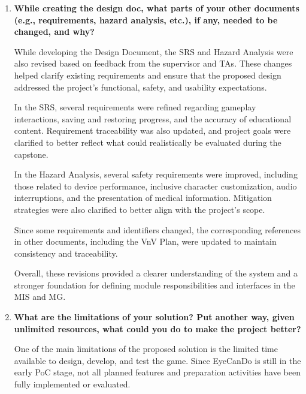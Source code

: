 \documentclass[10pt, titlepage]{article}
\begin{document}
\begin{enumerate}
    Other technical decisions, particularly the module
    decomposition and interfaces documented in the MG and MIS,
    were made based on the existing Unity PoC, the SRS,
    the Hazard Analysis, and software engineering principles.
    These decisions focused on separating responsibilities,
    reducing dependencies, and making the application easier
    to develop, test, and maintain.


    \item \textbf{While creating the design doc, what parts of your other
    documents (e.g., requirements, hazard analysis, etc.), if any, needed to
    be changed, and why?}

    While developing the Design Document, the SRS and Hazard
    Analysis were also revised based on feedback from the
    supervisor and TAs. These changes helped clarify existing
    requirements and ensure that the proposed design addressed
    the project's functional, safety, and usability expectations.

    In the SRS, several requirements were refined regarding
    gameplay interactions, saving and restoring progress, and
    the accuracy of educational content. Requirement traceability
    was also updated, and project goals were clarified to better
    reflect what could realistically be evaluated during the
    capstone.

    In the Hazard Analysis, several safety requirements were
    improved, including those related to device performance,
    inclusive character customization, audio interruptions,
    and the presentation of medical information. Mitigation
    strategies were also clarified to better align with the
    project's scope.

    Since some requirements and identifiers changed, the
    corresponding references in other documents, including
    the VnV Plan, were updated to maintain consistency
    and traceability.

    Overall, these revisions provided a clearer understanding
    of the system and a stronger foundation for defining
    module responsibilities and interfaces in the MIS and MG.

    \item \textbf{What are the limitations of your solution? Put another way,
    given unlimited resources, what could you do to make the project better?}

    
    One of the main limitations of the proposed solution is the
    limited time available to design, develop, and test the game.
    Since EyeCanDo is still in the early PoC stage, not all
    planned features and preparation activities have been
    fully implemented or evaluated.


\end{enumerate}
\end{document}
